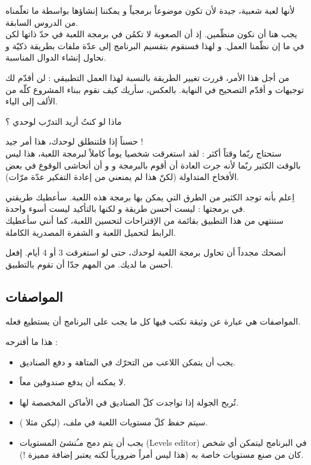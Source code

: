 لأنها لعبة شعبية، جيدة لأن تكون موضوعاً برمجياً و يمكننا إنشاؤها بواسطة ما تعلّمناه من الدروس السابقة.\\
يجب هنا أن نكون منظّمين. إذ أن الصعوبة لا تكمُن في برمجة اللعبة في حدّ ذاتها لكن في ما إن نظّمنا العمل. و لهذا فسنقوم بتقسيم البرنامج إلى عدّة ملفات
بطريقة ذكيّة و نحاول إنشاء الدوال المناسبة.

من أجل هذا الأمر، قررت تغيير الطريقة بالنسبة لهذا العمل  التطبيقي : لن أقدّم لك توجيهات و أقدّم التصحيح في النهاية. بالعكس، سأريك كيف نقوم ببناء المشروع كلّه من الألف إلى الياء.

\begin{question}
ماذا لو كنتُ أريد التدرّب لوحدي ؟
\end{question}

حسناً إذا فلتنطلق لوحدك، هذا أمر جيد !\\
ستحتاج ربّما وقتاً أكثر : لقد استغرقت شخصيا يوماً كاملاً لبرمجة اللعبة، هذا ليس بالوقت الكثير ربّما لأنه جرت العادة أن أقوم بالبرمجة و و أن أتحاشى الوقوع في بعض الأفخاخ المتداولة (لكنّ هذا لم يمنعني من إعادة التفكير عدّة مرّات).

اِعلم بأنه توجد الكثير من الطرق التي يمكن بها برمجة هذه اللعبة. سأعطيك طريقتي في برمجتها : ليست أحسن طريقة و لكنها بالتأكيد ليست أسوء واحدة.\\
سننتهي من هذا التطبيق بقائمة من الإقتراحات لتحسين اللعبة، كما أنني سأعطيك الرابط لتحميل اللعبة و الشفرة المصدرية الكاملة.

أنصحك مجدداً أن تحاول برمجة اللعبة لوحدك، حتى لو استغرقت 3 أو 4 أيام. إفعل أحسن ما لديك. من المهم جدّا أن تقوم بالتطبيق.

\subsection{المواصفات}

المواصفات هي عبارة عن وثيقة نكتب فيها كل ما يجب على البرنامج أن يستطيع فعله.

هذا ما أقترحه :

\begin{itemize}
	\item يجب أن يتمكن اللاعب من التحرّك في المتاهة و دفع الصناديق.
	\item لا يمكنه أن يدفع صندوقين معاً.
	\item تُربح الجولة إذا تواجدت كلّ الصناديق في الأماكن المخصصة لها.
	\item سيتم حفظ كلّ مستويات اللعبة في ملف، (ليكن مثلا 
	).
	\item يجب أن يتم دمج مـُنشئ المستويات 
	(\textenglish{Levels editor})
	في البرنامج ليتمكن أي شخص كان من صنع مستويات خاصة به (هذا ليس أمراً ضرورياً لكنه يعتبر إضافة مميزة !).
\end{itemize}

